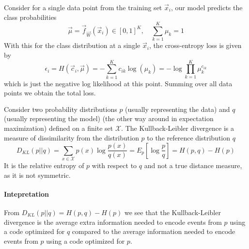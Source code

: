 Consider for a single data point from the training set $\vec{x}_i$, our model
predicts the class probabilities
\begin{equation}
    \vec{\mu} = \vec{f}_\vec{W}(\vec{x}_i) \in [0,1]^K, \quad \sum_{k=1}^K \mu_k = 1
\end{equation}
With this for the class distribution at a single $\vec{x}_i$, the cross-entropy loss is given by
\begin{equation}
    \epsilon_i = H(\vec{c}_i, \vec{\mu}) = -\sum_{k=1}^K c_{ik} \log(\mu_k) = -\log \prod_{k=1}^K \mu_k^{c_{ik}}
\end{equation}
which is just the negative log likelihood at this point. Summing over all data points
we obtain the total loss.

Consider two probability distributions $p$ (usually representing the data) and $q$ (usually representing the model)
(the other way around in expectation maximization) defined on a finite set $\mathcal{X}$.
The Kullback-Leibler divergence is a measure of dissimilarity from the distribution $p$ to the
reference distribution $q$
\begin{equation}
    D_{KL}(p||q) = \sum_{x \in \mathcal{X}} p(x) \log \frac{p(x)}{q(x)} = E_p[\log \frac{p}{q}] = H(p,q) - H(p)
\end{equation}
It is the relative entropy of $p$ with respect to $q$ and not a true distance measure, as it is not symmetric.

\paragraph*{Intepretation} From $D_{KL}(p||q) = H(p,q) - H(p)$ we see that the Kullback-Leibler divergence
is the average extra information needed to encode events from $p$ using a code optimized for $q$ compared
to the average information needed to encode events from $p$ using a code optimized for $p$.


\pagebreak